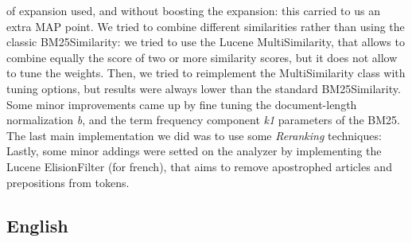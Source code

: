 of expansion used, and without boosting the expansion: this carried to us an extra MAP point.
We tried to combine different similarities rather than using the classic BM25Similarity: we tried to use the Lucene MultiSimilarity, that allows to combine equally the score of two or more similarity scores, but it does not allow to
tune the weights. Then, we tried to reimplement the MultiSimilarity class with tuning options, but results were always lower than the standard BM25Similarity. Some minor improvements came up by fine tuning the document-length
normalization \textit{b}, and the term frequency component \textit{k1} parameters of the BM25.
The last main implementation we did was to use some \textit{Reranking} techniques:  
Lastly, some minor addings were setted on the analyzer by implementing the Lucene ElisionFilter (for french), that aims to remove apostrophed articles and prepositions from tokens.

\subsection{English}
